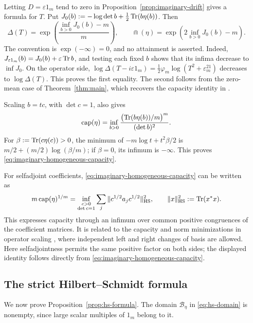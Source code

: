 Letting $D=\varepsilon1_m$ tend to zero in Proposition~\ref{prop:imaginary-drift} gives a formula for $T$.
Put $J_0(b):=-\log\det b+\tfrac12\operatorname{Tr}(b\eta(b))$.
Then
\begin{equation}\label{eq:imaginary-zero}
 \Delta(T)=\exp\left(\frac{\inf_{b>0}J_0(b)-m}{m}\right),
 \qquad
 \Cap(\eta)=\exp\left(2\inf_{b>0}J_0(b)-m\right).
\end{equation}
The convention is $\exp(-\infty)=0$, and no attainment is asserted.
Indeed, $J_{\varepsilon1_m}(b)=J_0(b)+\varepsilon\operatorname{Tr} b$, and testing each fixed $b$ shows that its infima decrease to $\inf J_0$.
On the operator side, $\log\Delta(T-i\varepsilon1_m) =\frac12\varphi_m\log(T^2+\varepsilon^21_m)$ decreases to $\log\Delta(T)$.
This proves the first equality.
The second follows from the zero-mean case of Theorem~\ref{thm:main}, which recovers the capacity identity in \cite[Theorem 1.2]{MS24}.

Scaling $b=tc$, with $\det c=1$, also gives
\begin{equation}\label{eq:imaginary-homogeneous-capacity}
 \operatorname{cap}(\eta)=\inf_{b>0}
   \frac{\bigl(\operatorname{Tr}(b\eta(b))/m\bigr)^m}{(\det b)^2}.
\end{equation}
For $\beta:=\operatorname{Tr}(c\eta(c))>0$, the minimum of $-m\log t+t^2\beta/2$ is $m/2+(m/2)\log(\beta/m)$; if $\beta=0$, its infimum is $-\infty$.
This proves \eqref{eq:imaginary-homogeneous-capacity}.

\begin{remark}\label{rem:capacity-congruence}
For selfadjoint coefficients, \eqref{eq:imaginary-homogeneous-capacity} can be written as
\[
 m\operatorname{cap}(\eta)^{1/m}
 =\inf_{\substack{c>0\\\det c=1}}
       \sum_j\|c^{1/2}a_jc^{1/2}\|_{\rm HS}^2,
 \qquad \|x\|_{\rm HS}^2:=\operatorname{Tr}(x^*x).
\]
This expresses capacity through an infimum over common positive congruences of the coefficient matrices.
It is related to the capacity and norm minimizations in operator scaling \cite{AZGL+18}, where independent left and right changes of basis are allowed.
Here selfadjointness permits the same positive factor on both sides; the displayed identity follows directly from \eqref{eq:imaginary-homogeneous-capacity}.
\end{remark}

\subsection{The strict Hilbert--Schmidt formula}
We now prove Proposition~\ref{prop:hs-formula}.
The domain $\mathcal B_\eta$ in \eqref{eq:hs-domain} is nonempty, since large scalar multiples of $1_m$ belong to it.

